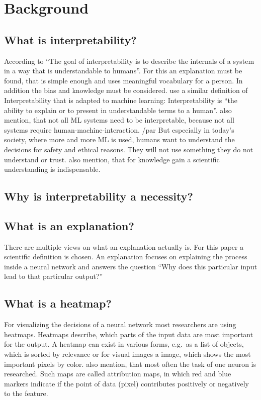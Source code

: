 \section{Background}


\subsection{What is interpretability?}
According to  “The goal of interpretability is to describe the internals of a system in a way that is understandable to humans”. For this an explanation must be found, that is simple enough and uses meaningful vocabulary for a person. In addition the bias and knowledge must be considered.
 use a similar definition of Interpretability that is adapted to machine learning: Interpretability is “the ability to explain or to present in understandable terms to a human”.  also mention, that not all ML systems need to be interpretable, because not all systems require human-machine-interaction. 
/par
But especially in today's society, where more and more ML is used, humans want to understand the decisions for safety and ethical reasons. They will not use something they do not understand or trust.
 also mention, that for knowledge gain a scientific understanding is indispensable.


\subsection{Why is interpretability a necessity?}

\subsection{What is an explanation?}
There are multiple views on what an explanation actually is. For this paper a scientific definition is chosen. An explanation focuses on explaining the process inside a neural network and answers the question “Why does this particular input lead to that particular output?” \cite[2]{Gilpin.2018}

\subsection{What is a heatmap?} 
For visualizing the decisions of a neural network most researchers are using heatmaps. Heatmaps describe, which parts of the input data are most important for the output. A heatmap can exist in various forms, e.g.\ as a list of objects, which is sorted by relevance or for visual images a image, which shows the most important pixels by color. \cite{Acona.2018} also mention, that most often the task of one neuron is researched. Such maps are called attribution maps, in which red and blue markers indicate if the point of data (pixel) contributes positively or negatively to the feature.

